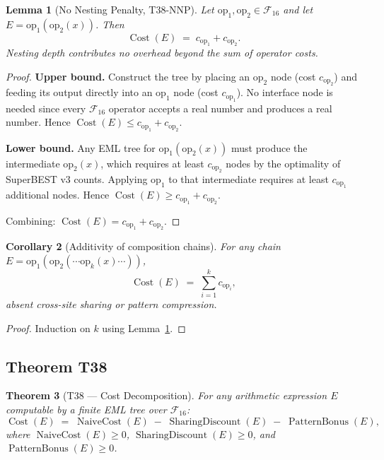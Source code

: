 \documentclass[12pt,a4paper]{article}
\newtheorem{theorem}{Theorem}[section]
\newtheorem{lemma}[theorem]{Lemma}
\newtheorem{corollary}[theorem]{Corollary}
\theoremstyle{definition}
\newcommand{\Cost}{\operatorname{Cost}}
\newcommand{\NC}{\operatorname{NaiveCost}}
\newcommand{\SD}{\operatorname{SharingDiscount}}
\newcommand{\PB}{\operatorname{PatternBonus}}
\begin{document}
\begin{lemma}[No Nesting Penalty, T38-NNP]
\label{lem:NNP}
Let $\mathrm{op}_1, \mathrm{op}_2 \in \mathcal{F}_{16}$ and let
$E = \mathrm{op}_1(\mathrm{op}_2(x))$.  Then
\[
  \Cost(E) \;=\; c_{\mathrm{op}_1} + c_{\mathrm{op}_2}.
\]
Nesting depth contributes no overhead beyond the sum of operator costs.
\end{lemma}

\begin{proof}
\textbf{Upper bound.}
Construct the tree by placing an $\mathrm{op}_2$ node (cost $c_{\mathrm{op}_2}$)
and feeding its output directly into an $\mathrm{op}_1$ node
(cost $c_{\mathrm{op}_1}$).  No interface node is needed since every
$\mathcal{F}_{16}$ operator accepts a real number and produces a real number.
Hence $\Cost(E) \leq c_{\mathrm{op}_1} + c_{\mathrm{op}_2}$.

\textbf{Lower bound.}
Any EML tree for $\mathrm{op}_1(\mathrm{op}_2(x))$ must produce the
intermediate $\mathrm{op}_2(x)$, which requires at least $c_{\mathrm{op}_2}$
nodes by the optimality of SuperBEST v3 counts.  Applying $\mathrm{op}_1$ to
that intermediate requires at least $c_{\mathrm{op}_1}$ additional nodes.
Hence $\Cost(E) \geq c_{\mathrm{op}_1} + c_{\mathrm{op}_2}$.

Combining: $\Cost(E) = c_{\mathrm{op}_1} + c_{\mathrm{op}_2}$.
\end{proof}

\begin{corollary}[Additivity of composition chains]
\label{cor:chain}
For any chain $E = \mathrm{op}_1(\mathrm{op}_2(\cdots\mathrm{op}_k(x)\cdots))$,
\[
  \Cost(E) \;=\; \sum_{i=1}^{k} c_{\mathrm{op}_i},
\]
absent cross-site sharing or pattern compression.
\end{corollary}

\begin{proof}
Induction on $k$ using Lemma~\ref{lem:NNP}.
\end{proof}

\subsection{Theorem T38}

\begin{theorem}[T38 --- Cost Decomposition]
\label{thm:T38}
For any arithmetic expression $E$ computable by a finite EML tree over
$\mathcal{F}_{16}$:
\[
  \boxed{\Cost(E) \;=\; \NC(E) \;-\; \SD(E) \;-\; \PB(E),}
\]
where $\NC(E) \geq 0$, $\SD(E) \geq 0$, and $\PB(E) \geq 0$.
\end{theorem}
\end{document}
